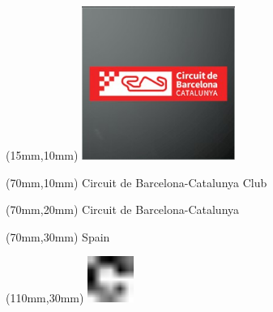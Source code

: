\null\newpage
\begin{textblock*}{50mm}(15mm,10mm)%
\includegraphics[width=50mm]{LG/2015-05-20_00078.png}
\end{textblock*}
\begin{textblock*}{130mm}(70mm,10mm)%
{\fontsize{20}{20}\selectfont Circuit de Barcelona-Catalunya Club}\\
\end{textblock*}
\begin{textblock*}{120mm}(70mm,20mm)%
{\fontsize{16}{16}\selectfont Circuit de Barcelona-Catalunya}\\
\end{textblock*}
\begin{textblock*}{120mm}(70mm,30mm)%
{\fontsize{12}{12}\selectfont Spain}
\end{textblock*}
\begin{textblock*}{30mm}(110mm,30mm)%
\centering
\includegraphics[height=15mm]{icons/fa-rotate-right.pdf}
\end{textblock*}
